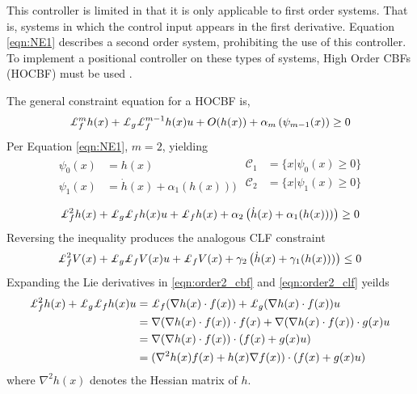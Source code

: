 \noindent This controller is limited in that it is only applicable to first order systems. That is, systems in which the control input appears in the first derivative. Equation \ref{eqn:NE1} describes a second order system, prohibiting the use of this controller. To implement a positional controller on these types of systems, High Order CBFs (HOCBF) must be used \cite{Xiao, Nguyen}. \newline

The general constraint equation for a HOCBF is, 
\begin{align}
    \Lie_f^m h(x) + \Lie_g\Lie_f^{m-1}h(x)u + O(h(x)) + \alpha_m\left (\psi_{m-1}(x) \right ) \geq 0
\end{align}
\noindent Per Equation \ref{eqn:NE1}, $m = 2$, yielding
\begin{align}
   \begin{split}
        \psi_0(x) &= h(x) \\
        \psi_1(x) &= \dot{h}(x) + \alpha_1(h(x)))
   \end{split}
   \begin{split}
        \mathcal{C}_1 &= \{ x | \psi_0(x) \geq 0\} \\
        \mathcal{C}_2 &= \{ x | \psi_1(x) \geq 0\} \\
   \end{split}
\end{align}
\begin{align} \label{eqn:order2_cbf}
     \Lie_f^2 h(x) + \Lie_g\Lie_f h(x)u + \Lie_f h(x) + \alpha_2\left (\dot{h}(x) + \alpha_1(h(x))) \right ) \geq 0
\end{align}
\noindent Reversing the inequality produces the analogous CLF constraint 
\begin{align} \label{eqn:order2_clf}
     \Lie_f^2 V(x) + \Lie_g\Lie_f V(x)u + \Lie_f V(x) + \gamma_2\left (\dot{h}(x) + \gamma_1(h(x))) \right ) \leq 0
\end{align}
Expanding the Lie derivatives in \ref{eqn:order2_cbf} and \ref{eqn:order2_clf} yeilds
\begin{align}
    \Lie_f^2 h(x) + \Lie_g\Lie_f h(x)u &= \Lie_f (\nabla h(x) \cdot f(x)) + \Lie_g(\nabla h(x) \cdot f(x))u \nonumber\\
    &= \nabla (\nabla h(x) \cdot f(x)) \cdot f(x) + \nabla (\nabla h(x) \cdot f(x)) \cdot g(x) u \nonumber\\
    &= \nabla (\nabla h(x) \cdot f(x)) \cdot (f(x) + g(x)u) \nonumber\\
    &= (\nabla^2h(x)f(x) + h(x) \nabla f(x)) \cdot (f(x) + g(x)u) \label{eqn:lie_expanded}
\end{align}
\noindent where $\nabla^2h(x)$ denotes the Hessian matrix of $h$. \newline

